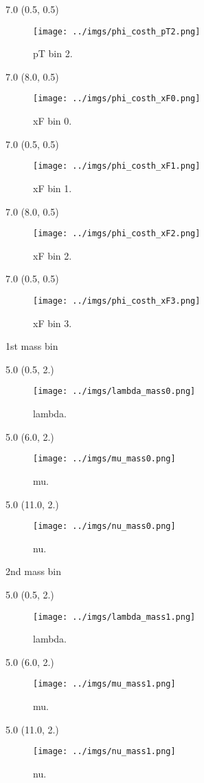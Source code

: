 \documentclass[12pt, xcolor={dvipsnames}, aspectratio = 169, sans,mathserif]{beamer}
\newenvironment{Pic}[2]
{
\begin{textblock}{#1} #2
\begin{figure}
}
{
\end{figure}
\end{textblock}
}
\begin{document}
%
%
%
\begin{frame}
\begin{Pic}{7.0}{(0.5, 0.5)}
  \texttt{[image: ../imgs/phi\_costh\_pT2.png]}
  \caption{pT bin 2.}
\end{Pic}

\begin{Pic}{7.0}{(8.0, 0.5)}
  \texttt{[image: ../imgs/phi\_costh\_xF0.png]}
  \caption{xF bin 0.}
\end{Pic}
\end{frame}

%
%
%
\begin{frame}
\begin{Pic}{7.0}{(0.5, 0.5)}
  \texttt{[image: ../imgs/phi\_costh\_xF1.png]}
  \caption{xF bin 1.}
\end{Pic}

\begin{Pic}{7.0}{(8.0, 0.5)}
  \texttt{[image: ../imgs/phi\_costh\_xF2.png]}
  \caption{xF bin 2.}
\end{Pic}
\end{frame}

%
%
%
\begin{frame}
\begin{Pic}{7.0}{(0.5, 0.5)}
  \texttt{[image: ../imgs/phi\_costh\_xF3.png]}
  \caption{xF bin 3.}
\end{Pic}
\end{frame}

%
%
%
\begin{frame}{1st mass bin}
\begin{Pic}{5.0}{(0.5, 2.)}
  \texttt{[image: ../imgs/lambda\_mass0.png]}
  \caption{lambda.}
\end{Pic}

\begin{Pic}{5.0}{(6.0, 2.)}
  \texttt{[image: ../imgs/mu\_mass0.png]}
  \caption{mu.}
\end{Pic}

\begin{Pic}{5.0}{(11.0, 2.)}
  \texttt{[image: ../imgs/nu\_mass0.png]}
  \caption{nu.}
\end{Pic}
\end{frame}

%
%
%
\begin{frame}{2nd mass bin}
\begin{Pic}{5.0}{(0.5, 2.)}
  \texttt{[image: ../imgs/lambda\_mass1.png]}
  \caption{lambda.}
\end{Pic}

\begin{Pic}{5.0}{(6.0, 2.)}
  \texttt{[image: ../imgs/mu\_mass1.png]}
  \caption{mu.}
\end{Pic}

\begin{Pic}{5.0}{(11.0, 2.)}
  \texttt{[image: ../imgs/nu\_mass1.png]}
  \caption{nu.}
\end{Pic}
\end{frame}
\end{document}
